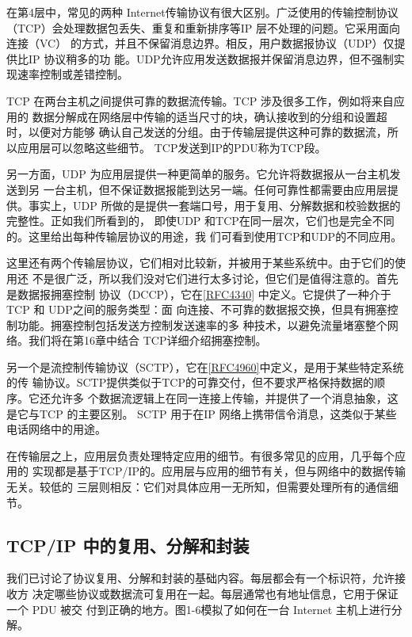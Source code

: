在第4层中，常见的两种 Internet传输协议有很大区别。广泛使用的传输控制协议
（TCP）会处理数据包丢失、重复和重新排序等IP 层不处理的问题。它采用面向连接（VC）
的方式，并且不保留消息边界。相反，用户数据报协议（UDP）仅提供比IP 协议稍多的功
能。UDP允许应用发送数据报并保留消息边界，但不强制实现速率控制或差错控制。

TCP 在两台主机之间提供可靠的数据流传输。TCP 涉及很多工作，例如将来自应用的
数据分解成在网络层中传输的适当尺寸的块，确认接收到的分组和设置超时，以便对方能够
确认自己发送的分组。由于传输层提供这种可靠的数据流，所以应用层可以忽略这些细节。
TCP发送到IP的PDU称为TCP段。

另一方面，UDP 为应用层提供一种更简单的服务。它允许将数据报从一台主机发送到另
一台主机，但不保证数据报能到达另一端。任何可靠性都需要由应用层提供。事实上，UDP
所做的是提供一套端口号，用于复用、分解数据和校验数据的完整性。正如我们所看到的，
即使UDP 和TCP在同一层次，它们也是完全不同的。这里给出每种传输层协议的用途，我
们可看到使用TCP和UDP的不同应用。

这里还有两个传输层协议，它们相对比较新，并被用于某些系统中。由于它们的使用还
不是很广泛，所以我们没对它们进行太多讨论，但它们是值得注意的。首先是数据报拥塞控制
协议（DCCP），它在\href{https://www.rfc-editor.org/rfc/rfc4340}{[RFC4340]}
中定义。它提供了一种介于TCP 和 UDP之间的服务类型：面
向连接、不可靠的数据报交换，但具有拥塞控制功能。拥塞控制包括发送方控制发送速率的多
种技术，以避免流量堵塞整个网络。我们将在第16章中结合 TCP详细介绍拥塞控制。

另一个是流控制传输协议（SCTP），它在\href{https://www.rfc-editor.org/rfc/rfc4960}{[RFC4960]}中定义，是用于某些特定系统的传
输协议。SCTP提供类似于TCP的可靠交付，但不要求严格保持数据的顺序。它还允许多
个数据流逻辑上在同一连接上传输，并提供了一个消息抽象，这是它与TCP 的主要区别。
SCTP 用于在IP 网络上携带信令消息，这类似于某些电话网络中的用途。

在传输层之上，应用层负责处理特定应用的细节。有很多常见的应用，几乎每个应用的
实现都是基于TCP/IP的。应用层与应用的细节有关，但与网络中的数据传输无关。较低的
三层则相反：它们对具体应用一无所知，但需要处理所有的通信细节。

\subsection{TCP/IP 中的复用、分解和封装}
我们已讨论了协议复用、分解和封装的基础内容。每层都会有一个标识符，允许接收方
决定哪些协议或数据流可复用在一起。每层通常也有地址信息，它用于保证一个 PDU 被交
付到正确的地方。图1-6模拟了如何在一台 Internet 主机上进行分解。

